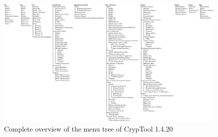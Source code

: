 \clearpage
\begin{figure}[hb]
\begin{center}
\vspace{-30pt}
\includegraphics[scale=0.25, angle=270, viewport=200 30 2660 1430]
                {figures/cryptool-menu-en}
\caption{Complete overview of the menu tree of CrypTool 1.4.20} 
\label{menuoverview}
\end{center}
\end{figure}
\clearpage

